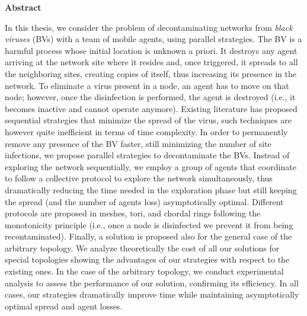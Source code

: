 
\begin{center}\textbf{Abstract}\end{center}



In this thesis, we consider  the problem of decontaminating networks from   {\em black viruses} (BVs)  with a team of   mobile agents, using parallel strategies.
The BV is a harmful process whose initial location is unknown a priori. It destroys any agent arriving at the network site where it resides and, once triggered, it spreads to all the neighboring sites, creating copies of itself, thus increasing its presence in the network. To eliminate a virus present in a node, an agent has to move on that node; however, once the disinfection is performed,   the agent is destroyed (i.e., it becomes inactive  and cannot operate anymore).
Existing literature has proposed sequential strategies that minimize the spread of the virus, such techniques are however   quite inefficient in terms of time complexity. In order to permanently remove any presence of the BV  faster, still  minimizing the number of site infections, we propose parallel strategies to decontaminate the BVs. Instead of exploring the network sequentially, we employ a group of agents that coordinate to follow a collective protocol to explore the network simultaneously, thus dramatically reducing the time needed in the exploration phase but still keeping the spread (and the number of agents loss)  asymptotically optimal. Different protocols are proposed in meshes, tori, and chordal rings following the monotonicity principle (i.e., once a node is disinfected we prevent it from being recontaminated). Finally, a solution is proposed also for the general case of the arbitrary topology.
 We analyze theoretically  the cost of all our solutions for special topologies showing the advantages of our strategies with respect to the existing ones.
 In the case of the arbitrary topology, we   conduct   experimental analysis to assess the performance of our solution, confirming its efficiency. In all cases, our strategies dramatically improve time while maintaining asymptotically optimal spread and agent losses.
 

 



\cleardoublepage
